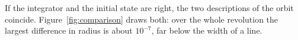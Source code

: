 If the integrator and the initial state are right, the two descriptions
of the orbit coincide.
Figure~\ref{fig:comparison} draws both: over the whole revolution the
largest difference in radius is about $10^{-7}$, far below the width of a line.

